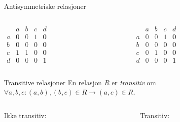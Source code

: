 \begin{frame}[fragile]{Antisymmetriske relasjoner}
    \pause
    \begin{columns}
        \begin{column}{0.3\textwidth}
            \begin{math}
                \begin{matrix}
                      & a & b & c & d\\
                    a & 0 & 0 & 1 & 0\\
                    b & 0 & 0 & 0 & 0\\
                    c & 1 & 1 & 0 & 0\\
                    d & 0 & 0 & 0 & 1
                \end{matrix}
            \end{math}
        \end{column}
        \begin{column}{0.3\textwidth}
            \begin{math}
                \begin{matrix}
                      & a & b & c & d\\
                    a & 0 & 0 & 1 & 0\\
                    b & 0 & 0 & 0 & 0\\
                    c & 0 & 1 & 0 & 0\\
                    d & 0 & 0 & 0 & 1
                \end{matrix}
            \end{math}
        \end{column}
    \end{columns}
\end{frame}

\begin{frame}[fragile]{Transitive relasjoner}
    En relasjon $R$ er \emph{transitiv} om $\forall a, b, c : (a, b), (b, c) \in R \rightarrow (a, c) \in R$.\\
    \begin{columns}
        \begin{column}{0.3\textwidth}
            Ikke transitiv:
        \end{column}
        \pause
        \begin{column}{0.3\textwidth}
            Transitiv:
        \end{column}
    \end{columns}
\end{frame}

